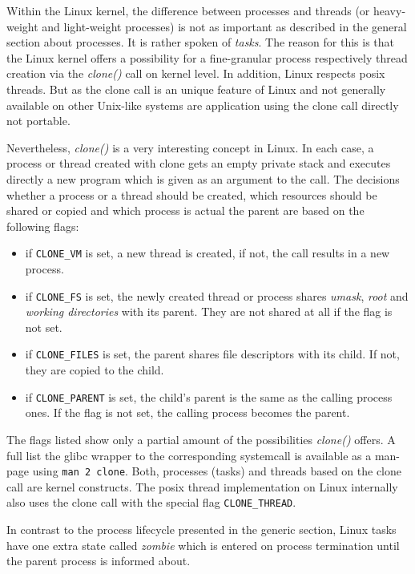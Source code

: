 Within the Linux kernel, the difference between processes and threads (or heavy-weight and light-weight processes) is not as important as described in the general section about processes.
It is rather spoken of \textit{tasks}.
The reason for this is that the Linux kernel offers a possibility for a fine-granular process respectively thread creation via the \textit{clone()} call on kernel level.
In addition, Linux respects \ac{posix} threads\cite{lfd430}.
But as the clone call is an unique feature of Linux and not generally available on other Unix-like systems are application using the clone call directly not portable\cite{tanenbaum-modern-operating-systems}.

Nevertheless, \textit{clone()} is a very interesting concept in Linux.
In each case, a process or thread created with clone gets an empty private stack and executes directly a new program which is given as an argument to the call.
The decisions whether a process or a thread should be created, which resources should be shared or copied and which process is actual the parent are based on the following flags:
\begin{itemize}
    \item if \texttt{CLONE\_VM} is set, a new thread is created, if not, the call results in a new process.
    \item if \texttt{CLONE\_FS} is set, the newly created thread or process shares \textit{umask}, \textit{root} and \textit{working directories} with its parent. They are not shared at all if the flag is not set.
    \item if \texttt{CLONE\_FILES} is set, the parent shares file descriptors with its child. If not, they are copied to the child.
    \item if \texttt{CLONE\_PARENT} is set, the child's parent is the same as the calling process ones. If the flag is not set, the calling process becomes the parent\cite{tanenbaum-modern-operating-systems}.
\end{itemize}

The flags listed show only a partial amount of the possibilities \textit{clone()} offers.
A full list the glibc wrapper to the corresponding systemcall is available as a man-page using \texttt{man 2 clone}.
Both, processes (tasks) and threads based on the clone call are kernel constructs.
The \ac{posix} thread implementation on Linux internally also uses the clone call with the special flag \texttt{CLONE\_THREAD}.

In contrast to the process lifecycle presented in the generic section, Linux tasks have one extra state called \textit{zombie} which is entered on process termination until the parent process is informed about\cite{mandl2014Grundkurs}.


